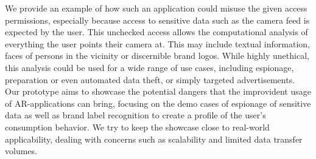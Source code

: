 We provide an example of how such an application could misuse the given access permissions, especially because access to sensitive data such as the camera feed is expected by the user.
This unchecked access allows the computational analysis of everything the user points their camera at.
This may include textual information, faces of persons in the vicinity or discernible brand logos.
While highly unethical, this analysis could be used for a wide range of use cases, including espionage, preparation or even automated data theft, or simply targeted advertisements.
Our prototype aims to showcase the potential dangers that the improvident usage of AR-applications can bring, focusing on the demo cases of espionage of sensitive data as well as brand label recognition to create a profile of the user's consumption behavior.
We try to keep the showcase close to real-world applicability, dealing with concerns such as scalability and limited data transfer volumes.

